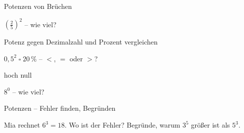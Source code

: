 \begin{aufgabe}{Potenzen von Brüchen}
\begin{teile}
\teil $\left(\frac{2}{5}\right)^2$ – wie viel? \leerfeld
\end{teile}
\end{aufgabe}

\begin{aufgabe}{Potenz gegen Dezimalzahl und Prozent vergleichen}
\begin{teile}
\teil $0{,}5^2 \;\square\; 20\,\%$ – $<$, $=$ oder $>$?
\end{teile}
\end{aufgabe}

\begin{aufgabe}{hoch null}
\begin{teile}
\teil $8^0$ – wie viel? \leerfeld
\end{teile}
\end{aufgabe}

\begin{aufgabe}{Potenzen – Fehler finden, Begründen}
\begin{teile}
\teil Mia rechnet $6^3 = 18$. Wo ist der Fehler?
\teil Begründe, warum $3^5$ größer ist als $5^3$.
\end{teile}
\end{aufgabe}
